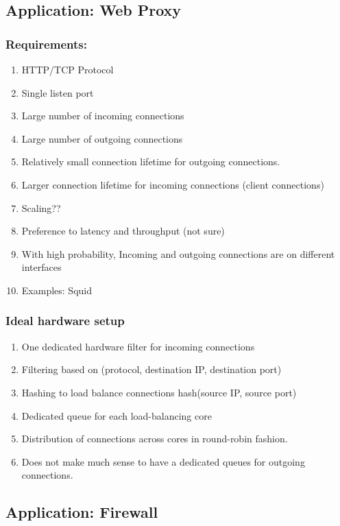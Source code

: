 \subsection{Application: Web Proxy}

\subsubsection{Requirements:}
\begin{enumerate}
    \item HTTP/TCP Protocol
    \item Single listen port
    \item Large number of incoming connections
    \item Large number of outgoing connections
    \item Relatively small connection lifetime for outgoing connections.
    \item Larger connection lifetime for incoming connections (client connections)
    \item Scaling??
    \item Preference to latency and throughput (not sure)
    \item With high probability, Incoming and outgoing connections are on
            different interfaces
    \item Examples: Squid
\end{enumerate}

\subsubsection{Ideal hardware setup}
\begin{enumerate}
    \item One dedicated hardware filter for incoming connections
    \item Filtering based on (protocol, destination IP, destination port)
    \item Hashing to load balance connections hash(source IP, source port)
    \item Dedicated queue for each load-balancing core
    \item Distribution of connections across cores in round-robin fashion.
    \item Does not make much sense to have a dedicated queues for outgoing
            connections.
\end{enumerate}

\subsection{Application: Firewall}

